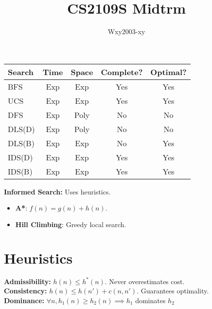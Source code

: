 \documentclass[twocolumn, 10pt]{article}
\begin{document}
\title{CS2109S Midtrm}
\author{Wxy2003-xy}
\date{}
\maketitle

\begin{tabular}{|l|c|c|c|c|}
    \hline
    \textbf{Search} & \textbf{Time} & \textbf{Space} & \textbf{Complete?} & \textbf{Optimal?} \\
    \hline
    BFS  & Exp & Exp  & Yes  & Yes  \\
    UCS  & Exp & Exp  & Yes  & Yes  \\
    DFS  & Exp & Poly & No   & No   \\
    DLS(D)  & Exp & Poly & No   & No   \\
    DLS(B)  & Exp & Exp & No   & Yes   \\
    IDS(D)  & Exp & Exp  & Yes  & Yes  \\
    IDS(B)  & Exp & Exp  & Yes  & Yes  \\
    \hline
\end{tabular}
\newline
\textbf{Informed Search:} Uses heuristics.
\begin{itemize}
    \item \textbf{A*}: $f(n) = g(n) + h(n)$.
    \item \textbf{Hill Climbing}: Greedy local search.
\end{itemize}

\section*{Heuristics}
\textbf{Admissibility:} $h(n) \leq h^*(n)$. Never overestimates cost.\\
\textbf{Consistency:} $h(n) \leq h(n') + c(n, n')$. Guarantees optimality.\\
\textbf{Dominance:} $\forall n, h_1(n) \geq h_2(n) \implies h_1$ dominates $h_2$
\end{document}
